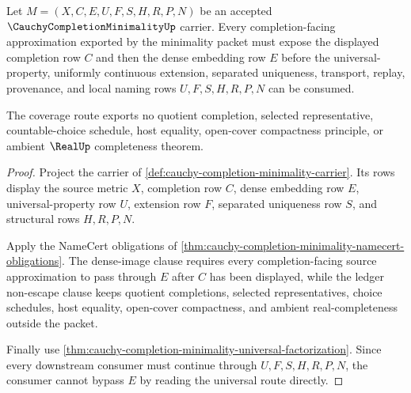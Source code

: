 \begin{theorem}
\label{thm:cauchy-completion-minimality-dense-image-coverage}
Let $M=(X,C,E,U,F,S,H,R,P,N)$ be an accepted $\CauchyCompletionMinimalityUp$ carrier. Every completion-facing approximation exported by the minimality packet must expose the displayed completion row $C$ and then the dense embedding row $E$ before the universal-property, uniformly continuous extension, separated uniqueness, transport, replay, provenance, and local naming rows $U,F,S,H,R,P,N$ can be consumed.

The coverage route exports no quotient completion, selected representative, countable-choice schedule, host equality, open-cover compactness principle, or ambient $\RealUp$ completeness theorem.
\end{theorem}
\begin{proof}
Project the carrier of \autoref{def:cauchy-completion-minimality-carrier}. Its rows display the source metric $X$, completion row $C$, dense embedding row $E$, universal-property row $U$, extension row $F$, separated uniqueness row $S$, and structural rows $H,R,P,N$.

Apply the NameCert obligations of \autoref{thm:cauchy-completion-minimality-namecert-obligations}. The dense-image clause requires every completion-facing source approximation to pass through $E$ after $C$ has been displayed, while the ledger non-escape clause keeps quotient completions, selected representatives, choice schedules, host equality, open-cover compactness, and ambient real-completeness outside the packet.

Finally use \autoref{thm:cauchy-completion-minimality-universal-factorization}. Since every downstream consumer must continue through $U,F,S,H,R,P,N$, the consumer cannot bypass $E$ by reading the universal route directly.
\end{proof}

